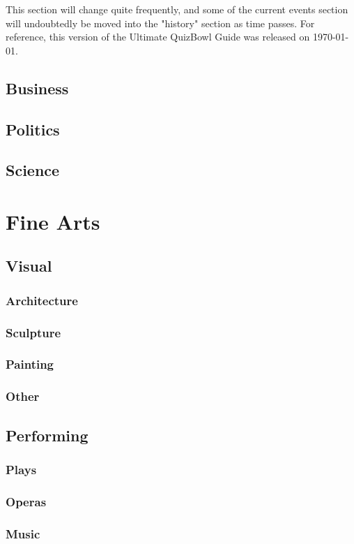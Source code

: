 \documentclass[12pt]{book}
\begin{document}
		This section will change quite frequently, and some of the current events section will undoubtedly be moved into the "history" section as time passes.  For reference, this version of the Ultimate QuizBowl Guide was released on \today. 
				
	\section{Business}
	\section{Politics}
	\section{Science}

\chapter{Fine Arts}
	\section{Visual}
		\subsection{Architecture}
		\subsection{Sculpture}
		\subsection{Painting}
		\subsection{Other}

	\section{Performing}
		\subsection{Plays}
		\subsection{Operas}
		\subsection{Music}
\end{document}
